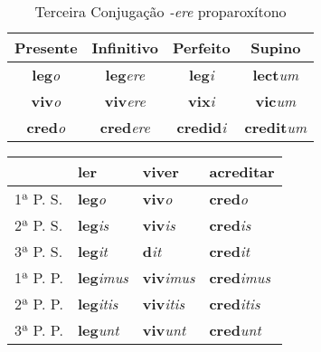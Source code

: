 \documentclass{book}
\newcommand{\radicaldesinencia}[2]{\textbf{#1}\textit{#2}}
\begin{document}
\begin{table}
\centering
\caption{Terceira Conjugação  \textit{-ere} proparoxítono}
\vspace{0.2cm}
\begin{tabular}{c|c|c|c}
\hline
Presente		&	Infinitivo		&	Perfeito		&	Supino	\\
\hline                                    		
\radicaldesinencia{leg}{o}	&	\radicaldesinencia{leg}{ere}	&	\radicaldesinencia{leg}{i}	&	\radicaldesinencia{lect}{um}	\\
\radicaldesinencia{viv}{o}	&	\radicaldesinencia{viv}{ere}	&	\radicaldesinencia{vix}{i}	&	\radicaldesinencia{vic}{um}	\\
\radicaldesinencia{cred}{o}	&	\radicaldesinencia{cred}{ere}	&	\radicaldesinencia{credid}{i}	&	\radicaldesinencia{credit}{um}	\\
 \hline
\end{tabular}
\end{table}

\begin{table}
\centering
\begin{tabular}{l|l|l|l}
\hline
 & ler & viver & acreditar \\
\hline
1ª P. S.	&  \radicaldesinencia{leg}{o}		& \radicaldesinencia{viv}{o}		& \radicaldesinencia{cred}{o} \\
2ª P. S.	&  \radicaldesinencia{leg}{is} 	& \radicaldesinencia{viv}{is}		& \radicaldesinencia{cred}{is} \\
3ª P. S.	&  \radicaldesinencia{leg}{it} 	& \radicaldesinencia{d}{it}		& \radicaldesinencia{cred}{it} \\
\hline
\hline
1ª P. P.	&  \radicaldesinencia{leg}{imus} 	& \radicaldesinencia{viv}{imus}	& \radicaldesinencia{cred}{imus} \\
2ª P. P. 	&  \radicaldesinencia{leg}{itis} 	& \radicaldesinencia{viv}{itis} 	& \radicaldesinencia{cred}{itis} \\
3ª P. P.	&  \radicaldesinencia{leg}{unt} 	& \radicaldesinencia{viv}{unt}		& \radicaldesinencia{cred}{unt} \\ 
\hline
\end{tabular}
\end{table}
\clearpage
\end{document}

